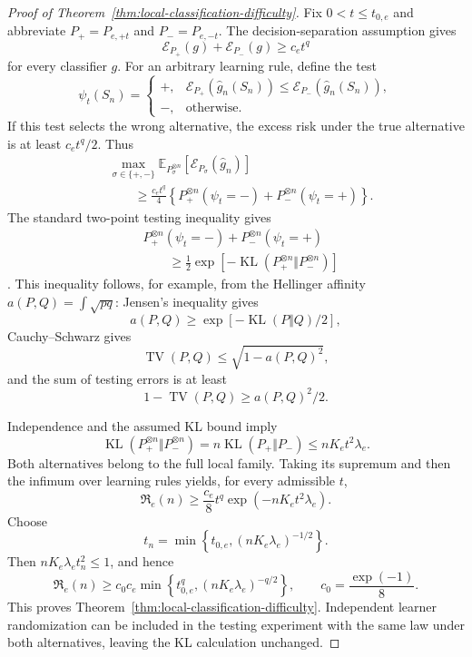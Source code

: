 \begin{proof}[Proof of Theorem~\ref{thm:local-classification-difficulty}]

Fix \(0<t\le t_{0,e}\) and abbreviate \(P_+=P_{e,+t}\) and \(P_-=P_{e,-t}\). The decision-separation assumption gives
\[
\mathcal E_{P_+}(g)+\mathcal E_{P_-}(g)\ge c_et^q
\]
for every classifier \(g\). For an arbitrary learning rule, define the test
\[
\psi_t(S_n)
=
\begin{cases}
+,
&
\mathcal E_{P_+}(\widehat g_n(S_n))
\le
\mathcal E_{P_-}(\widehat g_n(S_n)),
\\
-,
&
\text{otherwise}.
\end{cases}
\tag{A.16}\label{eq:app-induced-test}
\]
If this test selects the wrong alternative, the excess risk under the true alternative is at least \(c_et^q/2\). Thus
\[
\begin{aligned}
&\max_{\sigma\in\{+,-\}}
\mathbb E_{P_\sigma^{\otimes n}}
\!\left[
\mathcal E_{P_\sigma}(\widehat g_n)
\right]
\\
&\qquad\ge
\frac{c_et^q}{4}
\left\{
P_+^{\otimes n}(\psi_t=-)
+
P_-^{\otimes n}(\psi_t=+)
\right\}.
\end{aligned}
\tag{A.17}\label{eq:app-risk-to-testing}
\]
The standard two-point testing inequality gives
\[
\begin{aligned}
&P_+^{\otimes n}(\psi_t=-)
+
P_-^{\otimes n}(\psi_t=+)
\\
&\qquad\ge
\frac12
\exp\!\left[
-\operatorname{KL}
\!\left(
P_+^{\otimes n}\Vert P_-^{\otimes n}
\right)
\right]
\end{aligned}
\tag{A.18}\label{eq:app-testing-errors}
\]
\citep{lecam1986asymptotic,tsybakov2009introduction}. This inequality follows, for example, from the Hellinger affinity \(a(P,Q)=\int\sqrt{pq}\): Jensen's inequality gives
\[
a(P,Q)\ge
\exp[-\operatorname{KL}(P\Vert Q)/2],
\]
Cauchy--Schwarz gives
\[
\operatorname{TV}(P,Q)\le\sqrt{1-a(P,Q)^2},
\]
and the sum of testing errors is at least
\[
1-\operatorname{TV}(P,Q)\ge a(P,Q)^2/2.
\]

Independence and the assumed KL bound imply
\[
\operatorname{KL}
\!\left(P_+^{\otimes n}\Vert P_-^{\otimes n}\right)
=
n\operatorname{KL}(P_+\Vert P_-)
\le
nK_et^2\lambda_e.
\]
Both alternatives belong to the full local family. Taking its supremum and then the infimum over learning rules yields, for every admissible \(t\),
\[
\mathfrak R_e(n)
\ge
\frac{c_e}{8}t^q
\exp(-nK_et^2\lambda_e).
\tag{A.19}\label{eq:app-testing-reduction}
\]
Choose
\[
t_n
=
\min\left\{
t_{0,e},
(nK_e\lambda_e)^{-1/2}
\right\}.
\]
Then \(nK_e\lambda_et_n^2\le1\), and hence
\[
\mathfrak R_e(n)
\ge
c_0c_e
\min\left\{
t_{0,e}^{q},
(nK_e\lambda_e)^{-q/2}
\right\},
\qquad
c_0=\frac{\exp(-1)}8.
\tag{A.20}\label{eq:app-local-risk-bound}
\]
This proves Theorem~\ref{thm:local-classification-difficulty}. Independent learner randomization can be included in the testing experiment with the same law under both alternatives, leaving the KL calculation unchanged. \end{proof}

